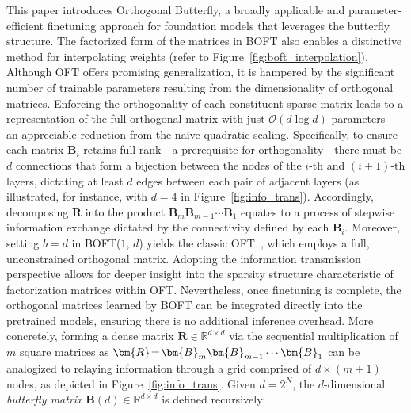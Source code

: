 This paper introduces Orthogonal Butterfly, a broadly applicable and parameter-efficient finetuning approach for foundation models that leverages the butterfly structure. The factorized form of the matrices in BOFT also enables a distinctive method for interpolating weights (refer to Figure~\ref{fig:boft_interpolation}). Although OFT offers promising generalization, it is hampered by the significant number of trainable parameters resulting from the dimensionality of orthogonal matrices. Enforcing the orthogonality of each constituent sparse matrix leads to a representation of the full orthogonal matrix with just $\mathcal{O}(d\log d)$ parameters—an appreciable reduction from the naïve quadratic scaling. Specifically, to ensure each matrix $\bm{B}_i$ retains full rank—a prerequisite for orthogonality—there must be $d$ connections that form a bijection between the nodes of the $i$-th and $(i+1)$-th layers, dictating at least $d$ edges between each pair of adjacent layers (as illustrated, for instance, with $d=4$ in Figure~\ref{fig:info_trans}). Accordingly, decomposing $\bm{R}$ into the product $\bm{B}_m\bm{B}_{m-1}\cdots\bm{B}_1$ equates to a process of stepwise information exchange dictated by the connectivity defined by each $\bm{B}_i$. Moreover, setting $b=d$ in BOFT($1$, $d$) yields the classic OFT~\cite{qiu2023controlling}, which employs a full, unconstrained orthogonal matrix. Adopting the information transmission perspective allows for deeper insight into the sparsity structure characteristic of factorization matrices within OFT. Nevertheless, once finetuning is complete, the orthogonal matrices learned by BOFT can be integrated directly into the pretrained models, ensuring there is no additional inference overhead. More concretely, forming a dense matrix $\bm{R}\in\mathbb{R}^{d\times d}$ via the sequential multiplication of $m$ square matrices as $\thickmuskip=2mu \medmuskip=2mu \bm{R}=\bm{B}_m\bm{B}_{m-1}\cdots\bm{B}_1$ can be analogized to relaying information through a grid comprised of $d\times (m+1)$ nodes, as depicted in Figure~\ref{fig:info_trans}. Given $d=2^N$, the $d$-dimensional \emph{butterfly matrix} $\bm{B}(d)\in\mathbb{R}^{d\times d}$ is defined recursively:


